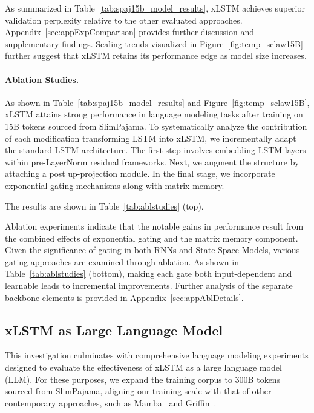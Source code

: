 As summarized in Table~\ref{tab:spaj15b_model_results}, xLSTM achieves superior validation perplexity relative to the other evaluated approaches. Appendix~\ref{sec:appExpComparison} provides further discussion and supplementary findings. Scaling trends visualized in Figure~\ref{fig:temp_sclaw15B} further suggest that xLSTM retains its performance edge as model size increases.

\paragraph{Ablation Studies.}
As shown in Table~\ref{tab:spaj15b_model_results} and Figure~\ref{fig:temp_sclaw15B}, xLSTM attains strong performance in language modeling tasks after training on 15B tokens sourced from SlimPajama. To systematically analyze the contribution of each modification transforming LSTM into xLSTM, we incrementally adapt the standard LSTM architecture. The first step involves embedding LSTM layers within pre-LayerNorm residual frameworks. Next, we augment the structure by attaching a post up-projection module. In the final stage, we incorporate exponential gating mechanisms along with matrix memory.

The results are shown in Table~\ref{tab:ablstudies} (top). 

Ablation experiments indicate that the notable gains in performance result from the combined effects of exponential gating and the matrix memory component. Given the significance of gating in both RNNs and State Space Models, various gating approaches are examined through ablation. As shown in Table~\ref{tab:ablstudies} (bottom), making each gate both input-dependent and learnable leads to incremental improvements. Further analysis of the separate backbone elements is provided in Appendix~\ref{sec:appAblDetails}.

\subsection{xLSTM as Large Language Model}
\label{sec:ExpLanguage}

This investigation culminates with comprehensive language modeling experiments designed to evaluate the effectiveness of xLSTM as a large language model (LLM). For these purposes, we expand the training corpus to 300B tokens sourced from SlimPajama, aligning our training scale with that of other contemporary approaches, such as Mamba~\citep{Gu:24arxiv} and Griffin~\citep{De:24arxiv}.

